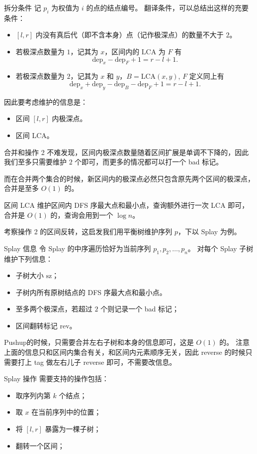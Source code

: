 \documentclass{beamer}
\begin{document}
{{\begin{frame}{拆分条件}
  记 $p_i$ 为权值为 $i$ 的点的结点编号。
  翻译条件，可以总结出这样的充要条件：
  \begin{itemize}
    \item $[l, r]$ 内没有真后代（即不含本身）点（记作极深点）的数量不大于 $2$。 
    \item 若极深点数量为 $1$，记其为 $x$，区间内的 $\text{LCA}$ 为 $F$ 有 \[
      \text{dep}_x - \text{dep}_F + 1 = r - l + 1.
    \]
    \item 若极深点数量为 $2$，记其为 $x$ 和 $y$，$B = \text{LCA}(x, y)$, $F$ 定义同上有 \[
      \text{dep}_x+\text{dep}_y -\text{dep}_B-\text{dep}_F+1 = r - l + 1.
    \]
  \end{itemize}
  因此要考虑维护的信息是：
  \begin{itemize}
    \item 区间 $[l, r]$ 内极深点。
    \item 区间 LCA。
  \end{itemize}
\end{frame}

\begin{frame}{合并和操作 2}
  不难发现，区间内极深点数量随着区间扩展是单调不下降的，因此我们至多只需要维护 $2$ 个即可，而更多的情况都可以打一个 bad 标记。

  而在合并两个集合的时候，新区间内的极深点必然只包含原先两个区间的极深点，合并是至多 $O(1)$ 的。

  区间 LCA 维护区间内 DFS 序最大点和最小点，查询额外进行一次 LCA 即可，合并是 $O(1)$ 的，查询会用到一个 $\log n$。

  考察操作 2 的区间反转，这启发我们用平衡树维护序列 $p$，下以 Splay 为例。
\end{frame}

\begin{frame}{Splay 信息}
  令 Splay 的中序遍历恰好为当前序列 $p_1,p_2,\ldots,p_n$。
  对每个 Splay 子树维护下列信息：
  \begin{itemize}
    \item 子树大小 $\text{sz}$；
    \item 子树内所有原树结点的 DFS 序最大点和最小点。
    \item 至多两个极深点，若超过 $2$ 个则记录一个 bad 标记；
    \item 区间翻转标记 $\text{rev}$。
  \end{itemize}
  Pushup的时候，只需要合并左右子树和本身的信息即可，这是 $O(1)$ 的。
  注意上面的信息只和区间内集合有关，和区间内元素顺序无关，因此 reverse 的时候只需要打上 tag 做左右儿子 reverse 即可，不需要改信息。
\end{frame}
\begin{frame}{Splay 操作}
  需要支持的操作包括：
  \begin{itemize}
    \item 取序列内第 $k$ 个结点；
    \item 取 $x$ 在当前序列中的位置；
    \item 将 $[l, r]$ 暴露为一棵子树；
    \item 翻转一个区间；
  \end{itemize}
\end{frame}

}}
\end{document}
